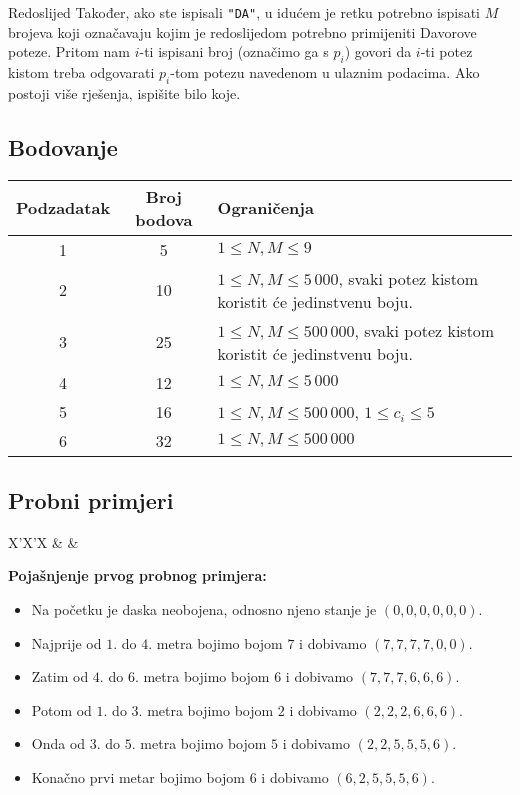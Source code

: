 \begin{statement}[
  problempoints=100,
  timelimit=4 sekunde,
  memorylimit=512 MiB,
]{Redoslijed}
Također, ako ste ispisali \texttt{"DA"}, u idućem je retku potrebno ispisati
$M$ brojeva koji označavaju kojim je redoslijedom potrebno primijeniti Davorove
poteze. Pritom nam $i$-ti ispisani broj (označimo ga s $p_i$) govori da $i$-ti
potez kistom treba odgovarati $p_i$-tom potezu navedenom u ulaznim podacima. 
Ako postoji više rješenja, ispišite bilo koje. 
\subsection*{Bodovanje}
{\renewcommand{\arraystretch}{1.4}
  \setlength{\tabcolsep}{6pt}
  \begin{tabular}{ccl}
 Podzadatak & Broj bodova & Ograničenja \\ \midrule
  1 & 5 & $1 \le N, M \le 9$ \\
  2 & 10 & $1 \le N, M \le 5\,000$, svaki potez kistom koristit će jedinstvenu boju. \\
  3 & 25 & $1 \le N, M \le 500\,000$, svaki potez kistom koristit će jedinstvenu boju. \\
  4 & 12 & $1 \le N, M \le 5\,000$ \\
  5 & 16 & $1 \le N, M \le 500\,000$, $1 \le c_i \le 5$\\
  6 & 32 & $1 \le N, M \le 500\,000$ \\
\end{tabular}}

\subsection*{Probni primjeri}
\begin{tabularx}{\textwidth}{X'X'X}
 &
 &
\end{tabularx}

\textbf{Pojašnjenje prvog probnog primjera:}
\begin{itemize}
  \item Na početku je daska neobojena, odnosno njeno stanje je $(0, 0, 0, 0, 0, 0)$.
  \item Najprije od $1.$ do $4.$ metra bojimo bojom $7$ i dobivamo $(7, 7, 7, 7, 0, 0)$.
  \item Zatim od $4.$ do $6.$ metra bojimo bojom $6$ i dobivamo $(7, 7, 7, 6, 6, 6)$.
  \item Potom od $1.$ do $3.$ metra bojimo bojom $2$ i dobivamo $(2, 2, 2, 6, 6, 6)$.
  \item Onda od $3.$ do $5.$ metra bojimo bojom $5$ i dobivamo $(2, 2, 5, 5, 5, 6)$.
  \item Konačno prvi metar bojimo bojom $6$ i dobivamo $(6, 2, 5, 5, 5, 6)$.
\end{itemize}


\end{statement}
